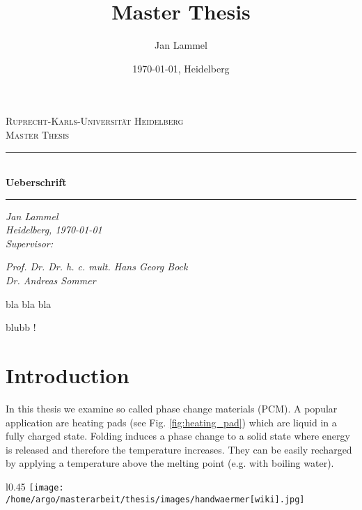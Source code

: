 \documentclass{scrartcl}[12pt, halfparskip]
\title{Master Thesis}
\author{Jan Lammel}
\date{\today{}, Heidelberg}
\numberwithin{equation}{section}
\numberwithin{figure}{section}
\numberwithin{table}{section}
\begin{document}
\begin{titlepage}
	\begin{center}
	
	\textsc{\large Ruprecht-Karls-Universit\"{a}t Heidelberg} \\[0.5cm]
	\textsc{\large Master Thesis}\\[1cm]
	
	\newcommand{\HRule}{\rule{\linewidth}{0.5mm}}
	\HRule \\[0.4cm]
	\huge \bfseries Ueberschrift
	\HRule 
	
	\vspace{11cm}
	
	\Large \textit{Jan Lammel }\\
	\Large \textit{Heidelberg, \today }\\ \vspace{0.5cm}
	\Large \textit{Supervisor:}
	
	\Large \textit{Prof. Dr. Dr. h. c. mult. Hans Georg Bock}\\
	\Large \textit{Dr. Andreas Sommer}
	
	\end{center}
\end{titlepage}

\newpage

\tableofcontents 
\newpage

 

 bla bla bla
 
 
 \newpage

blubb !

\newpage
{}

\section{Introduction}
In this thesis we examine so called phase change materials (PCM). A popular application are heating pads (see Fig. \ref{fig:heating_pad}) which are liquid in a fully charged state. Folding induces a phase change to a solid state where energy is released and therefore the temperature increases. They can be easily recharged by applying a temperature above the melting point (e.g. with boiling water). 

\begin{wrapfigure}{l}{0.45\textwidth}
	\texttt{[image: /home/argo/masterarbeit/thesis/images/handwaermer[wiki].jpg]}
	\caption{Heating pad \\ left: liquid; right: solid}
	\label{fig:heating_pad}
\end{wrapfigure}
\end{document}
